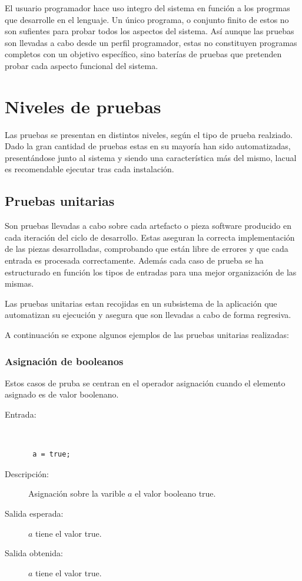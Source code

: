 El usuario programador hace uso integro del sistema en función a los progrmas que desarrolle en el lenguaje. Un único programa, o conjunto finito de estos no 
son sufientes para probar todos los aspectos del sistema. Así aunque las pruebas son llevadas a cabo desde un perfil programador, estas no constituyen programas 
completos con un objetivo específico, sino baterías de pruebas que pretenden probar cada aspecto funcional del sistema. 

\section{Niveles de pruebas}
Las pruebas se presentan en distintos niveles, según el tipo de prueba realziado. Dado la gran cantidad de pruebas estas en su mayoría han sido automatizadas, presentándose
junto al sistema y siendo una característica más del mismo, lacual es recomendable ejecutar tras cada instalación. 

\subsection{Pruebas unitarias}
Son pruebas llevadas a cabo sobre cada artefacto o pieza software producido en cada iteración del ciclo de desarrollo. Estas aseguran la correcta implementación
de las piezas desarrolladas, comprobando que están libre de errores y que cada entrada es procesada correctamente. Además cada caso de prueba se ha estructurado en función 
los tipos de entradas para una mejor organización de las mismas. 
 
Las pruebas unitarias estan recojidas en un subsistema de la aplicación que automatizan su ejecución y asegura que son llevadas a cabo de forma regresiva. 

A continuación se expone algunos ejemplos de las pruebas unitarias realizadas:

\subsubsection{Asignación de booleanos}
Estos casos de pruba se centran en el operador asignación cuando el elemento asignado es de valor boolenano.

\begin{framed}
	\begin{description}
		\item [Entrada:]\hfill \\
\begin{lstlisting}
 a = true;
\end{lstlisting}
		\item [Descripción:] Asignación sobre la varible $a$ el valor booleano true.
		\item [Salida esperada:] $a$ tiene el valor true.
		\item [Salida obtenida:] $a$ tiene el valor true.
	\end{description}
\end{framed}

